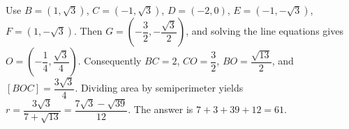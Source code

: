 Use $B=(1,\sqrt3)$, $C=(-1,\sqrt3)$, $D=(-2,0)$, $E=(-1,-\sqrt3)$, $F=(1,-\sqrt3)$. Then $G=(-\dfrac{3}{2},-\dfrac{\sqrt3}{2})$, and solving the line equations gives $O=(-\dfrac{1}{4},\dfrac{\sqrt3}{4})$. Consequently $BC=2$, $CO=\dfrac{3}{2}$, $BO=\dfrac{\sqrt{13}}{2}$, and $[BOC]=\dfrac{3\sqrt3}{4}$. Dividing area by semiperimeter yields $r=\dfrac{3\sqrt3}{7+\sqrt{13}}=\dfrac{7\sqrt3-\sqrt{39}}{12}$. The answer is $7+3+39+12=\boxed{61}$.
